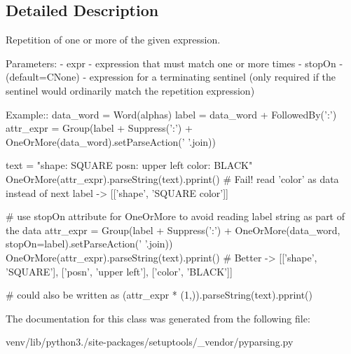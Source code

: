 \subsection{Detailed Description}
\begin{DoxyVerb}Repetition of one or more of the given expression.

Parameters:
 - expr - expression that must match one or more times
 - stopOn - (default=C{None}) - expression for a terminating sentinel
      (only required if the sentinel would ordinarily match the repetition 
      expression)          

Example::
    data_word = Word(alphas)
    label = data_word + FollowedBy(':')
    attr_expr = Group(label + Suppress(':') + OneOrMore(data_word).setParseAction(' '.join))

    text = "shape: SQUARE posn: upper left color: BLACK"
    OneOrMore(attr_expr).parseString(text).pprint()  # Fail! read 'color' as data instead of next label -> [['shape', 'SQUARE color']]

    # use stopOn attribute for OneOrMore to avoid reading label string as part of the data
    attr_expr = Group(label + Suppress(':') + OneOrMore(data_word, stopOn=label).setParseAction(' '.join))
    OneOrMore(attr_expr).parseString(text).pprint() # Better -> [['shape', 'SQUARE'], ['posn', 'upper left'], ['color', 'BLACK']]
    
    # could also be written as
    (attr_expr * (1,)).parseString(text).pprint()
\end{DoxyVerb}
 

The documentation for this class was generated from the following file\+:\begin{DoxyCompactItemize}
\item 
venv/lib/python3./site-\/packages/setuptools/\+\_\+vendor/pyparsing.\+py\end{DoxyCompactItemize}
